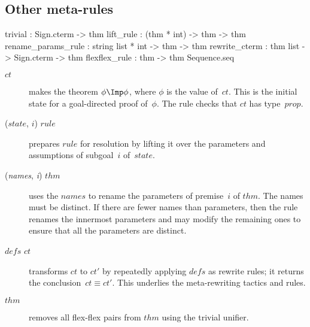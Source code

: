 \subsection{Other meta-rules}
\begin{ttbox} 
trivial            : Sign.cterm -> thm
lift_rule          : (thm * int) -> thm -> thm
rename_params_rule : string list * int -> thm -> thm
rewrite_cterm      : thm list -> Sign.cterm -> thm
flexflex_rule      : thm -> thm Sequence.seq
\end{ttbox}
\begin{description}
\item[ $ct$] 
makes the theorem \(\phi\Imp\phi\), where $\phi$ is the value of~$ct$.
This is the initial state for a goal-directed proof of~$\phi$.  The rule
checks that $ct$ has type~$prop$.

\item[ ($state$, $i$) $rule$] 
prepares $rule$ for resolution by lifting it over the parameters and
assumptions of subgoal~$i$ of~$state$.

\item[ ({\it names}, {\it i}) $thm$] 
uses the $names$ to rename the parameters of premise~$i$ of $thm$.  The
names must be distinct.  If there are fewer names than parameters, then the
rule renames the innermost parameters and may modify the remaining ones to
ensure that all the parameters are distinct.

\item[ $defs$ $ct$]
transforms $ct$ to $ct'$ by repeatedly applying $defs$ as rewrite rules; it
returns the conclusion~$ct\equiv ct'$.  This underlies the meta-rewriting
tactics and rules.

\item[ $thm$]  
removes all flex-flex pairs from $thm$ using the trivial unifier.
\end{description}
